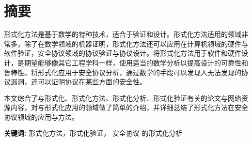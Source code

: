 
\section*{ \centering \textbf{摘要} }

\vskip0.5cm

形式化方法是基于数学的特种技术，适合于验证和设计。形式化方法适用的领域非常多，除了在数学领域的机器证明，形式化方法还可以应用在计算机领域的硬件与软件验证，安全协议领域的协议验证与协议设计。将形式化方法用于软件和硬件设计，是期望能够像其它工程学科一样，使用适当的数学分析以提高设计的可靠性和鲁棒性。将形式化应用于安全协议分析，通过数学的手段可以发现人无法发现的协议漏洞，还可以证明协议在某些方面的安全性。

本文综合了与形式化、形式化方法、形式化分析、形式化验证有关的论文与网络资源内容，对与形式化应用的领域做了简单的介绍，并详细总结了形式化方法在安全协议领域的应用与方法。

\textbf{关键词:}  形式化方法，形式化验证， 安全协议 的形式化分析 






